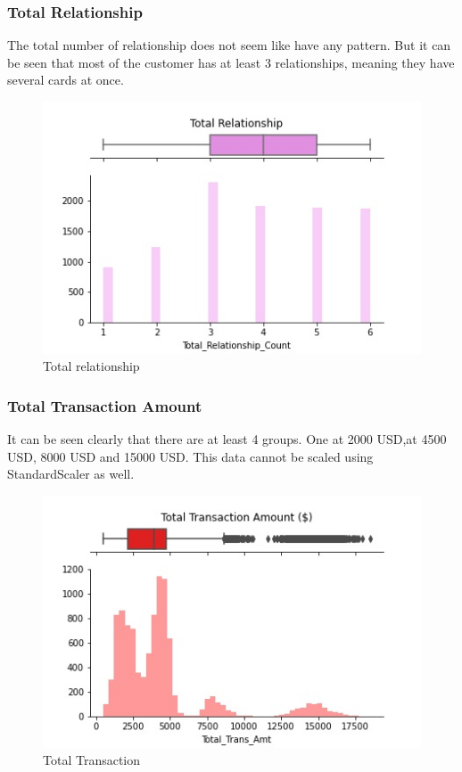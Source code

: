 \documentclass{homeworg}
\begin{document}
\subsubsection{Total Relationship}
The total number of relationship does not seem like have any pattern. But it can be seen that most of the customer has at least 3 relationships, meaning they have several cards at once.
\begin{figure}[H]
    \centering
    \includegraphics[scale=0.7]{figure/HG_Total_relationship.jpg}
    \caption{Total relationship}
    \label{fig:totalrelationship}
\end{figure}
\par
\subsubsection{Total Transaction Amount}
It can be seen clearly that there are at least 4 groups. One at 2000 USD,at 4500 USD, 8000 USD and 15000 USD. This data cannot be scaled using StandardScaler as well.
\begin{figure}[H]
    \centering
    \includegraphics[scale=0.7]{figure/HG_Total_transaction.jpg}
    \caption{Total Transaction}
    \label{fig:totaltransaction}
\end{figure}
\par
\end{document}
